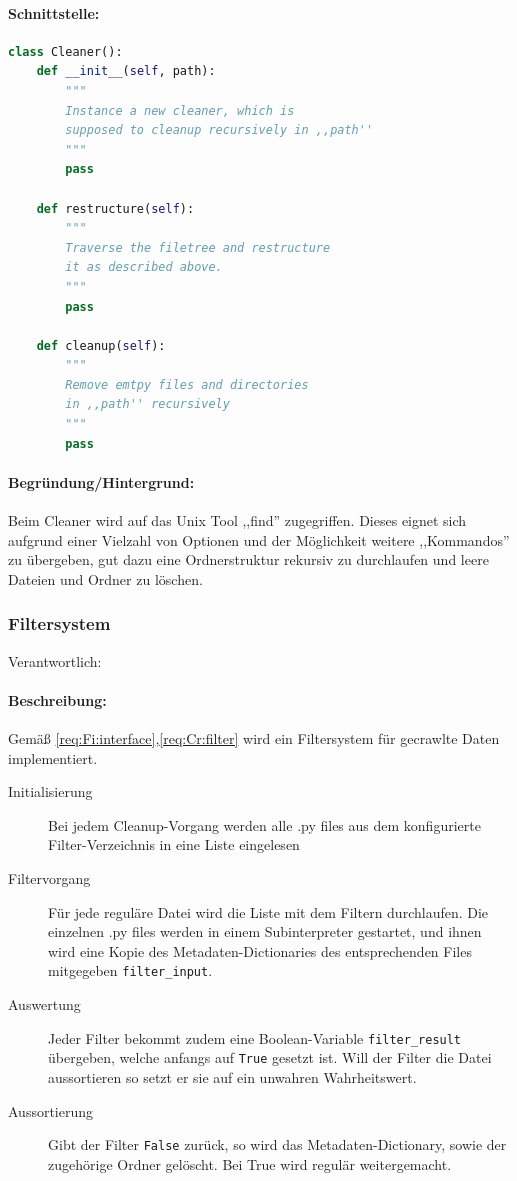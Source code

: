 \paragraph{Schnittstelle:} 
\label{par:schnittstelle_}
\hfill
\begin{lstlisting}[language=python]
class Cleaner():
    def __init__(self, path):
        """
        Instance a new cleaner, which is
        supposed to cleanup recursively in ,,path''
        """
        pass

    def restructure(self): 
        """
        Traverse the filetree and restructure
        it as described above.
        """
        pass
  
    def cleanup(self):
        """
        Remove emtpy files and directories
        in ,,path'' recursively
        """
        pass
\end{lstlisting}

\paragraph{Begründung/Hintergrund:}
\label{par:hintergrund_}
Beim Cleaner wird auf das Unix Tool ,,find'' zugegriffen. Dieses eignet sich aufgrund einer Vielzahl
von Optionen und der Möglichkeit weitere ,,Kommandos'' zu übergeben, gut dazu eine Ordnerstruktur rekursiv
zu durchlaufen und leere Dateien und Ordner zu löschen.


\subsubsection{Filtersystem}
\label{ssub:filtersystem}
Verantwortlich: \ciii 

\paragraph{Beschreibung:}
\label{par:beschreibung_}
Gemäß \ref{req:Fi:interface},\ref{req:Cr:filter} wird ein Filtersystem für gecrawlte Daten 
implementiert.
\begin{description}
  \item[Initialisierung] Bei jedem Cleanup-Vorgang werden alle .py files
    aus dem konfigurierte Filter-Verzeichnis in eine Liste eingelesen
  \item[Filtervorgang] Für jede reguläre Datei wird die Liste mit dem
    Filtern durchlaufen. Die einzelnen .py files werden in einem
    Subinterpreter gestartet, und ihnen wird eine Kopie des
    Metadaten-Dictionaries des entsprechenden Files mitgegeben
    \texttt{filter\_input}.
  \item[Auswertung] Jeder Filter bekommt zudem eine Boolean-Variable
    \texttt{filter\_result} übergeben, welche anfangs auf \texttt{True}
    gesetzt ist. Will der Filter die Datei aussortieren so setzt er sie
    auf ein unwahren Wahrheitswert. 
  \item[Aussortierung] Gibt der Filter \texttt{False} zurück, so wird
    das Metadaten-Dictionary, sowie der zugehörige Ordner gelöscht. 
    Bei True wird regulär weitergemacht.
\end{description}

